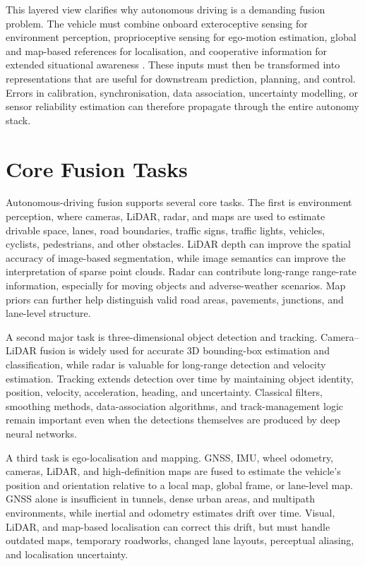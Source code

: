 \documentclass[11pt,oneside,openany]{book}
\begin{document}
This layered view clarifies why autonomous driving is a demanding fusion problem. The vehicle must combine onboard exteroceptive sensing for environment perception, proprioceptive sensing for ego-motion estimation, global and map-based references for localisation, and cooperative information for extended situational awareness \cite{2023:IEEE_ITSM,TANG2023109165}. These inputs must then be transformed into representations that are useful for downstream prediction, planning, and control. Errors in calibration, synchronisation, data association, uncertainty modelling, or sensor reliability estimation can therefore propagate through the entire autonomy stack.

\section{Core Fusion Tasks}

Autonomous-driving fusion supports several core tasks. The first is environment perception, where cameras, LiDAR, radar, and maps are used to estimate drivable space, lanes, road boundaries, traffic signs, traffic lights, vehicles, cyclists, pedestrians, and other obstacles. LiDAR depth can improve the spatial accuracy of image-based segmentation, while image semantics can improve the interpretation of sparse point clouds. Radar can contribute long-range range-rate information, especially for moving objects and adverse-weather scenarios. Map priors can further help distinguish valid road areas, pavements, junctions, and lane-level structure.

A second major task is three-dimensional object detection and tracking. Camera--LiDAR fusion is widely used for accurate 3D bounding-box estimation and classification, while radar is valuable for long-range detection and velocity estimation. Tracking extends detection over time by maintaining object identity, position, velocity, acceleration, heading, and uncertainty. Classical filters, smoothing methods, data-association algorithms, and track-management logic remain important even when the detections themselves are produced by deep neural networks.

A third task is ego-localisation and mapping. GNSS, IMU, wheel odometry, cameras, LiDAR, and high-definition maps are fused to estimate the vehicle's position and orientation relative to a local map, global frame, or lane-level map. GNSS alone is insufficient in tunnels, dense urban areas, and multipath environments, while inertial and odometry estimates drift over time. Visual, LiDAR, and map-based localisation can correct this drift, but must handle outdated maps, temporary roadworks, changed lane layouts, perceptual aliasing, and localisation uncertainty.
\end{document}
